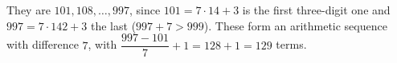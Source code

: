 They are $101,108,\dots,997$, since $101=7\cdot14+3$ is the first three-digit one and $997=7\cdot142+3$ the last ($997+7>999$). These form an arithmetic sequence with difference $7$, with $\dfrac{997-101}{7}+1=128+1=\boxed{129}$ terms.
